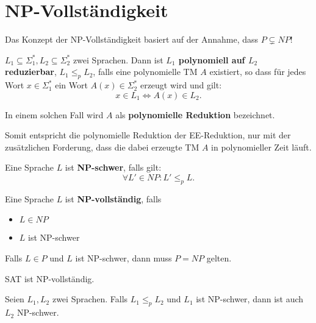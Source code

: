 \section{NP-Vollständigkeit}
Das Konzept der NP-Vollständigkeit basiert auf der Annahme, dass \(P \subsetneq NP\)!\\

\begin{definition}
\(L_1 \subseteq \Sigma_1^*, L_2 \subseteq \Sigma_2^*\) zwei Sprachen. Dann ist \textbf{\(L_1\) polynomiell auf \(L_2\) reduzierbar}, \(L_1 \leq_p L_2\), falls eine polynomielle TM \(A\) existiert, so dass für jedes Wort \(x \in \Sigma_1^*\) ein Wort \(A(x) \in \Sigma_2^*\) erzeugt wird und gilt:
\[
x \in L_1 \Leftrightarrow A(x) \in L_2.
\]

In einem solchen Fall wird \(A\) als \textbf{polynomielle Reduktion} bezeichnet.
\end{definition}

Somit entspricht die polynomielle Reduktion der EE-Reduktion, nur mit der zusätzlichen Forderung, dass die dabei erzeugte TM \(A\) in polynomieller Zeit läuft.\\

\begin{definition}
Eine Sprache \(L\) ist \textbf{NP-schwer}, falls gilt:
\[
\forall L' \in NP: L' \leq_p L.
\]
\end{definition}

\begin{definition}
Eine Sprache \(L\) ist \textbf{NP-vollständig}, falls
\begin{itemize}
  \item \(L \in NP\)
  \item \(L\) ist NP-schwer\\
\end{itemize}

\end{definition}

\begin{lemma}
Falls \(L \in P\) und \(L\) ist NP-schwer, dann muss \(P = NP\) gelten.\\
\end{lemma}

\begin{satz}
SAT ist NP-vollständig.\\
\end{satz}

\begin{lemma}
Seien \(L_1, L_2\) zwei Sprachen. Falls \(L_1 \leq_p L_2\) und \(L_1\) ist NP-schwer, dann ist auch \(L_2\) NP-schwer.\\
\end{lemma}

